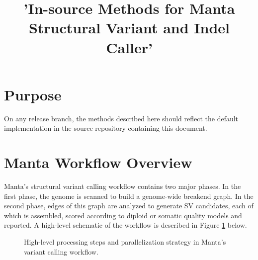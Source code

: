 \documentclass{article}
\title{'In-source Methods for Manta Structural Variant and Indel Caller'}
\begin{document}
\maketitle

\tableofcontents

\section{Purpose}

On any release branch, the methods described here should reflect the default implementation in the source repository containing this document.

\section{Manta Workflow Overview}

Manta's structural variant calling workflow contains two major phases. In the first phase, the genome is scanned to build a genome-wide breakend graph. In the second phase, edges of this graph are analyzed to generate SV candidates, each of which is assembled, scored according to diploid or somatic quality models and reported. A high-level schematic of the workflow is described in Figure \ref{fig:workflow} below.

\begin{figure}[h]
\centerline{
}
\caption{High-level processing steps and parallelization strategy in Manta's variant calling workflow.}
\label{fig:workflow}
\end{figure}
\end{document}
